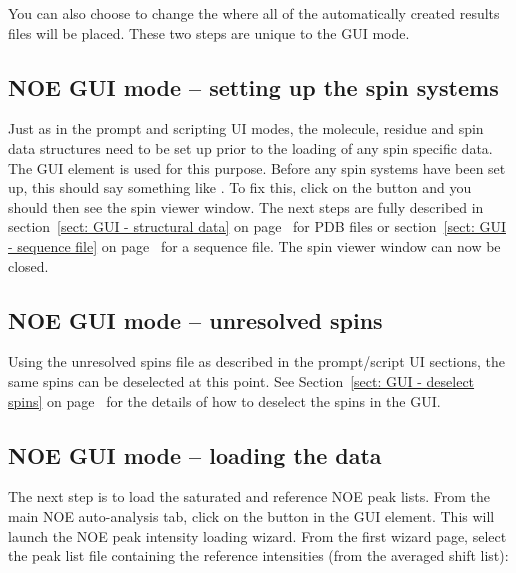 You can also choose to change the  where all of the automatically created results files will be placed.  These two steps are unique to the GUI mode.



\subsection{NOE GUI mode -- setting up the spin systems}

Just as in the prompt and scripting UI modes, the molecule, residue and spin data structures need to be set up prior to the loading of any spin specific data.  The  GUI element is used for this purpose.  Before any spin systems have been set up, this should say something like .  To fix this, click on the  button and you should then see the spin viewer window.  The next steps are fully described in section~\ref{sect: GUI - structural data} on page~\pageref{sect: GUI - structural data} for PDB files or section~\ref{sect: GUI - sequence file} on page~\pageref{sect: GUI - sequence file} for a sequence file.  The spin viewer window can now be closed.



\subsection{NOE GUI mode -- unresolved spins}

Using the unresolved spins file as described in the prompt/script UI sections, the same spins can be deselected at this point.  See Section~\ref{sect: GUI - deselect spins} on page~\pageref{sect: GUI - deselect spins} for the details of how to deselect the spins in the GUI.



\subsection{NOE GUI mode -- loading the data}

The next step is to load the saturated and reference NOE peak lists.  From the main NOE auto-analysis tab, click on the  button in the  GUI element.  This will launch the NOE peak intensity loading wizard.  From the first wizard page, select the peak list file containing the reference intensities (from the averaged shift list):

